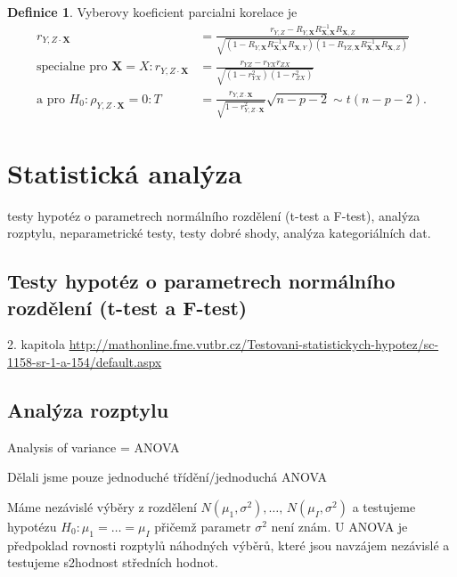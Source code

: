 \documentclass[a4]{report}
\theoremstyle{definition}
\newtheorem{definition}{Definice}[section]
\begin{document}
{\begin{definition}
Vyberovy koeficient parcialni korelace je
\begin{align*}
r_{Y,Z \cdot \mathbf{X}} &= \frac{r_{Y,Z} - R_{Y, \mathbf{X}} R_{\mathbf{X}, \mathbf{X}}^{-1} R_{\mathbf{X}, Z}}{\sqrt{(1 - R_{Y, \mathbf{X}} R_{\mathbf{X}, \mathbf{X}}^{-1} R_{\mathbf{X}, Y}) (1 - R_{YZ, \mathbf{X}} R_{\mathbf{X}, \mathbf{X}}^{-1} R_{\mathbf{X}, Z})}}\\
\text{specialne pro } \mathbf{X} = X: r_{Y, Z \cdot \mathbf{X}} &= \frac{r_{YZ} - r_{YX} r_{ZX}}{\sqrt{(1 - r_{YX}^2) (1 - r_{ZX}^2)}} \\
\text{a pro } H_0: \rho_{Y,Z \cdot \mathbf{X}} = 0: T &= \frac{r_{Y,Z \cdot \mathbf{X}}}{\sqrt{1 - r_{Y,Z \cdot \mathbf{X}}^2}} \sqrt{n - p -2} \sim t(n - p - 2).
\end{align*}
\end{definition}



\section{Statistická analýza}
testy hypotéz o parametrech normálního rozdělení (t-test a F-test), analýza rozptylu, neparametrické testy, testy dobré shody, analýza 
kategoriálních dat.

\subsection{Testy hypotéz o parametrech normálního rozdělení (t-test a F-test)}
2. kapitola 
\url{http://mathonline.fme.vutbr.cz/Testovani-statistickych-hypotez/sc-1158-sr-1-a-154/default.aspx}

\subsection{Analýza rozptylu}

Analysis of variance = ANOVA

Dělali jsme pouze jednoduché třídění/jednoduchá ANOVA

Máme nezávislé výběry z rozdělení $N\left(\mu_1,\sigma^2\right),\ldots,\,N\left(\mu_I,\sigma^2\right)$ a testujeme hypotézu $H_0:\mu_1=\ldots=\mu_I$ přičemž parametr $\sigma^2$ není znám. U ANOVA je předpoklad rovnosti rozptylů náhodných výběrů, které jsou navzájem nezávislé a testujeme s2hodnost středních hodnot. 

}
\end{document}
